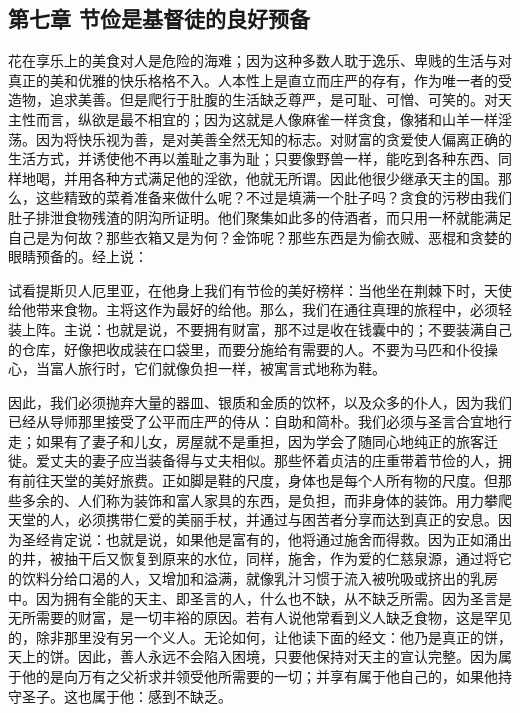 
\subsection{第七章 节俭是基督徒的良好预备}

花在享乐上的美食对人是危险的海难；因为这种多数人耽于逸乐、卑贱的生活与对真正的美和优雅的快乐格格不入。人本性上是直立而庄严的存有，作为唯一者的受造物，追求美善。但是爬行于肚腹的生活缺乏尊严，是可耻、可憎、可笑的。对天主性而言，纵欲是最不相宜的；因为这就是人像麻雀一样贪食，像猪和山羊一样淫荡。因为将快乐视为善，是对美善全然无知的标志。对财富的贪爱使人偏离正确的生活方式，并诱使他不再以羞耻之事为耻；只要像野兽一样，能吃到各种东西、同样地喝，并用各种方式满足他的淫欲，他就无所谓。因此他很少继承天主的国。那么，这些精致的菜肴准备来做什么呢？不过是填满一个肚子吗？贪食的污秽由我们肚子排泄食物残渣的阴沟所证明。他们聚集如此多的侍酒者，而只用一杯就能满足自己是为何故？那些衣箱又是为何？金饰呢？那些东西是为偷衣贼、恶棍和贪婪的眼睛预备的。经上说：\par

试看提斯贝人厄里亚，在他身上我们有节俭的美好榜样：当他坐在荆棘下时，天使给他带来食物。主将这作为最好的给他。那么，我们在通往真理的旅程中，必须轻装上阵。主说：也就是说，不要拥有财富，那不过是收在钱囊中的；不要装满自己的仓库，好像把收成装在口袋里，而要分施给有需要的人。不要为马匹和仆役操心，当富人旅行时，它们就像负担一样，被寓言式地称为鞋。\par

因此，我们必须抛弃大量的器皿、银质和金质的饮杯，以及众多的仆人，因为我们已经从导师那里接受了公平而庄严的侍从：自助和简朴。我们必须与圣言合宜地行走；如果有了妻子和儿女，房屋就不是重担，因为学会了随同心地纯正的旅客迁徙。爱丈夫的妻子应当装备得与丈夫相似。那些怀着贞洁的庄重带着节俭的人，拥有前往天堂的美好旅费。正如脚是鞋的尺度，身体也是每个人所有物的尺度。但那些多余的、人们称为装饰和富人家具的东西，是负担，而非身体的装饰。用力攀爬天堂的人，必须携带仁爱的美丽手杖，并通过与困苦者分享而达到真正的安息。因为圣经肯定说：也就是说，如果他是富有的，他将通过施舍而得救。因为正如涌出的井，被抽干后又恢复到原来的水位，同样，施舍，作为爱的仁慈泉源，通过将它的饮料分给口渴的人，又增加和溢满，就像乳汁习惯于流入被吮吸或挤出的乳房中。因为拥有全能的天主、即圣言的人，什么也不缺，从不缺乏所需。因为圣言是无所需要的财富，是一切丰裕的原因。若有人说他常看到义人缺乏食物，这是罕见的，除非那里没有另一个义人。无论如何，让他读下面的经文：他乃是真正的饼，天上的饼。因此，善人永远不会陷入困境，只要他保持对天主的宣认完整。因为属于他的是向万有之父祈求并领受他所需要的一切；并享有属于他自己的，如果他持守圣子。这也属于他：感到不缺乏。\par

